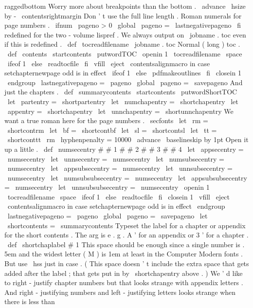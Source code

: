{{{{{raggedbottom
%
Worry
more
about
breakpoints
than
the
bottom
.
\
advance
\
hsize
by
-
\
contentsrightmargin
%
Don
'
t
use
the
full
line
length
.
%
%
Roman
numerals
for
page
numbers
.
\
ifnum
\
pageno
>
0
\
global
\
pageno
=
\
lastnegativepageno
\
fi
}
%
redefined
for
the
two
-
volume
lispref
.
We
always
output
on
%
\
jobname
.
toc
even
if
this
is
redefined
.
%
\
def
\
tocreadfilename
{
\
jobname
.
toc
}
%
Normal
(
long
)
toc
.
%
\
def
\
contents
{
%
\
startcontents
{
\
putwordTOC
}
%
\
openin
1
\
tocreadfilename
\
space
\
ifeof
1
\
else
\
readtocfile
\
fi
\
vfill
\
eject
\
contentsalignmacro
%
in
case
setchapternewpage
odd
is
in
effect
\
ifeof
1
\
else
\
pdfmakeoutlines
\
fi
\
closein
1
\
endgroup
\
lastnegativepageno
=
\
pageno
\
global
\
pageno
=
\
savepageno
}
%
And
just
the
chapters
.
\
def
\
summarycontents
{
%
\
startcontents
{
\
putwordShortTOC
}
%
%
\
let
\
partentry
=
\
shortpartentry
\
let
\
numchapentry
=
\
shortchapentry
\
let
\
appentry
=
\
shortchapentry
\
let
\
unnchapentry
=
\
shortunnchapentry
%
We
want
a
true
roman
here
for
the
page
numbers
.
\
secfonts
\
let
\
rm
=
\
shortcontrm
\
let
\
bf
=
\
shortcontbf
\
let
\
sl
=
\
shortcontsl
\
let
\
tt
=
\
shortconttt
\
rm
\
hyphenpenalty
=
10000
\
advance
\
baselineskip
by
1pt
%
Open
it
up
a
little
.
\
def
\
numsecentry
#
#
1
#
#
2
#
#
3
#
#
4
{
}
\
let
\
appsecentry
=
\
numsecentry
\
let
\
unnsecentry
=
\
numsecentry
\
let
\
numsubsecentry
=
\
numsecentry
\
let
\
appsubsecentry
=
\
numsecentry
\
let
\
unnsubsecentry
=
\
numsecentry
\
let
\
numsubsubsecentry
=
\
numsecentry
\
let
\
appsubsubsecentry
=
\
numsecentry
\
let
\
unnsubsubsecentry
=
\
numsecentry
\
openin
1
\
tocreadfilename
\
space
\
ifeof
1
\
else
\
readtocfile
\
fi
\
closein
1
\
vfill
\
eject
\
contentsalignmacro
%
in
case
setchapternewpage
odd
is
in
effect
\
endgroup
\
lastnegativepageno
=
\
pageno
\
global
\
pageno
=
\
savepageno
}
\
let
\
shortcontents
=
\
summarycontents
%
Typeset
the
label
for
a
chapter
or
appendix
for
the
short
contents
.
%
The
arg
is
e
.
g
.
A
'
for
an
appendix
or
3
'
for
a
chapter
.
%
\
def
\
shortchaplabel
#
1
{
%
%
This
space
should
be
enough
since
a
single
number
is
.
5em
and
the
%
widest
letter
(
M
)
is
1em
at
least
in
the
Computer
Modern
fonts
.
%
But
use
\
hss
just
in
case
.
%
(
This
space
doesn
'
t
include
the
extra
space
that
gets
added
after
%
the
label
;
that
gets
put
in
by
\
shortchapentry
above
.
)
%
%
We
'
d
like
to
right
-
justify
chapter
numbers
but
that
looks
strange
%
with
appendix
letters
.
And
right
-
justifying
numbers
and
%
left
-
justifying
letters
looks
strange
when
there
is
less
than
}}}}}
